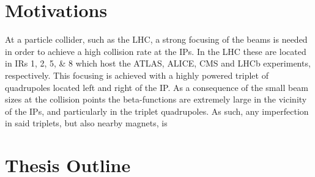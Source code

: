 
\section{Motivations}

At a particle collider, such as the \acrfull{LHC}, a strong focusing of the \glspl{beam} is needed in order to achieve a high collision rate at the \glspl{IP}.
In the LHC these are located in \glspl{IR} \numlist{1;2;5;8} which host the \acrshort{ATLAS}, \acrshort{ALICE}, \acrshort{CMS} and \acrshort{LHCb} \glspl{experiment}, respectively.
This focusing is achieved with a highly powered \gls{triplet} of quadrupoles located left and right of the IP.
As a consequence of the small beam sizes at the collision points the \glspl{beta-function} are extremely large in the vicinity of the IPs, and particularly in the triplet quadrupoles.
As such, any imperfection in said triplets, but also nearby magnets, is 

\section{Thesis Outline}

